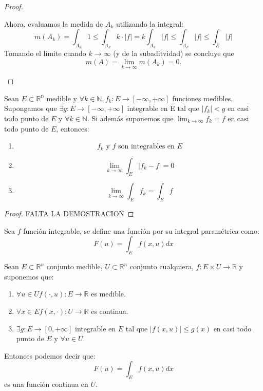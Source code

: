 \begin{proof}
\begin{enumerate}
        Ahora, evaluamos la medida de $ A_k $ utilizando la integral:  
        $$ m(A_k) = \int_{A_k} 1 \leq \int_{A_k} k \cdot |f| = k \int_{A_k} |f| \leq \int_{A_k} |f| \leq \int_E |f|$$  
        Tomando el límite cuando $ k \to \infty $ (y de la subaditvidad) se concluye que  
        $$ m(A) = \lim_{k \to \infty} m(A_k) = 0. $$  
    \end{enumerate}
\end{proof}
\begin{teorema}
    Sean $E \subset \mathbb{R^n}$ medible y $\forall k \in \mathbb{N}, f_k: E \to [-\infty, +\infty]$ funciones medibles. Supongamos que $\exists g: E \to [-\infty, +\infty]$ integrable en E tal que $|f_k| < g$ en casi todo punto de $E$ y $\forall k \in \mathbb{N}$. Si además suponemos que $\lim_{k \to \infty} f_k = f$ en casi todo punto de $E$, entonces: 
    \begin{enumerate}
        \item $$f_k \text{ y } f \text{ son integrables en }E$$
        \item $$\lim_{k \to \infty} \int_{E} |f_k - f| = 0$$
        \item $$\lim_{k \to \infty} \int_{E} f_k = \int_{E} f$$
    \end{enumerate}
\end{teorema}
\begin{proof}
    FALTA LA DEMOSTRACION
\end{proof}
\begin{definición}
    Sea $f$ función integrable, se define una función por su integral paramétrica como: 
    $$ F(u) = \int_{E}f(x, u)dx$$
\end{definición}
\begin{teorema}
    Sean $E \subset \mathbb{R}^n$ conjunto medible, $U \subset \mathbb{R}^n$ conjunto cualquiera, $f: E \times U \to \mathbb{R}$ y suponemos que: 
    \begin{enumerate}
        \item $\forall u \in U f(\cdot, u): E \to \mathbb{R}$ es medible.
        \item $\forall x \in E f(x, \cdot): U \to \mathbb{R}$ es continua.
        \item $\exists g: E \to [0, +\infty]$ integrable en $E$ tal que $|f(x, u)| \leq g(x)$ en casi todo punto de $E$ y $\forall u \in U$.
    \end{enumerate}
    Entonces podemos decir que: 
    $$ F(u) = \int_{E}f(x, u)dx $$ es una función continua en $U$.
\end{teorema}
